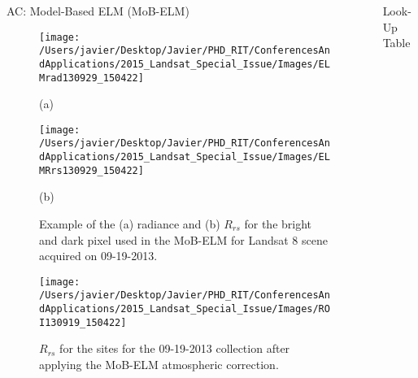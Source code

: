 \documentclass{beamer}
\begin{document}
\begin{frame}{}
\begin{columns}[t]
\begin{column}{.32\linewidth}
\begin{block}{AC: Model-Based ELM (MoB-ELM)}
\begin{figure}[htb]
\hspace{-.5cm}
  \begin{minipage}[c]{0.495\linewidth}
      \texttt{[image: /Users/javier/Desktop/Javier/PHD\_RIT/ConferencesAndApplications/2015\_Landsat\_Special\_Issue/Images/ELMrad130929\_150422]}\\
    \centerline{\small (a)}\medskip
  \end{minipage}
  \hspace{-.85cm}
  \begin{minipage}[d]{0.495\linewidth}
      \texttt{[image: /Users/javier/Desktop/Javier/PHD\_RIT/ConferencesAndApplications/2015\_Landsat\_Special\_Issue/Images/ELMRrs130929\_150422]}\\
    \centerline{\small (b)}\medskip
  \end{minipage}
  \caption{Example of the (a) radiance and (b) $R_{rs}$ for the bright and dark pixel used in the MoB-ELM for Landsat 8 scene acquired on 09-19-2013.\label{fig:MOBELMpxls} } 
\end{figure}

\begin{figure}[htbp!]
  \centering
  \texttt{[image: /Users/javier/Desktop/Javier/PHD\_RIT/ConferencesAndApplications/2015\_Landsat\_Special\_Issue/Images/ROI130919\_150422]}
  \caption{$R_{rs}$ for the sites for the 09-19-2013 collection after applying the MoB-ELM atmospheric correction.\label{fig:RrsROIs130919} } 
\end{figure}
\vspace{-.2cm}
\end{block}


\end{column}
 \begin{column}{.32\linewidth}
\begin{block}{Look-Up Table}



\end{block}
\end{column}
\end{columns}
\end{frame}
\end{document}

